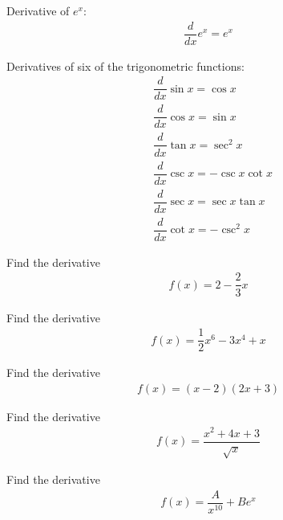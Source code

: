 \begin{theorem}
Derivative of $e^{x}$:
\begin{align*}
    \dfrac{d}{dx}e^{x} = e^{x}
\end{align*}
\end{theorem}

\begin{theorem}
Derivatives of six of the trigonometric functions:
\begin{align*}
    &\dfrac{d}{dx}\sin x = \cos x\\[2ex]
    &\dfrac{d}{dx}\cos x = \sin x\\[2ex]
    &\dfrac{d}{dx}\tan x = \sec^{2} x\\[2ex]
    &\dfrac{d}{dx}\csc x = -\csc x \cot x\\[2ex]
    &\dfrac{d}{dx}\sec x = \sec x \tan x\\[2ex]
    &\dfrac{d}{dx}\cot x = -\csc^{2} x
\end{align*}
\end{theorem}

\begin{exercise}
Find the derivative
\begin{align*}
    f(x) = 2 - \dfrac{2}{3}x
\end{align*}
\end{exercise}

\begin{exercise}
Find the derivative 
\begin{align*}
    f(x) = \dfrac{1}{2}x^{6} - 3x^{4} + x
\end{align*}
\end{exercise}

\begin{exercise}
Find the derivative
\begin{align*}
    f(x) = (x-2)(2x+3)
\end{align*}
\end{exercise}

\begin{exercise}
Find the derivative
\begin{align*}
    f(x) = \dfrac{x^{2} + 4x + 3}{\sqrt{x}}
\end{align*}
\end{exercise}

\begin{exercise}
Find the derivative
\begin{align*}
    f(x) = \dfrac{A}{x^{10}} + Be^{x}
\end{align*}
\end{exercise}

